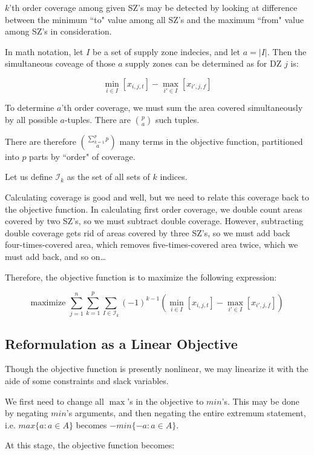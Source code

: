 \documentclass[a4paper]{article}
\begin{document}
$k$'th order coverage among given SZ's may be detected by looking at difference between the minimum ``to" value among all SZ's and the maximum ``from" value among SZ's in consideration.

In math notation, let $I$ be a set of supply zone indecies, and let $a = |I|$. Then the simultaneous coveage of those $a$ supply zones can be determined as for DZ $j$ is:

$$\min_{i \in I} [x_{i,j,t}] - \max_{i' \in I} [x_{i',j,f}]$$

To determine $a$'th order coverage, we must sum the area covered simultaneously by all possible $a$-tuples. There are $p\choose a$ such tuples.

There are therefore $\sum_{k=1}^p p\choose a$ many terms in the objective function, partitioned into $p$ parts by ``order" of coverage.

Let us define $\mathcal{I}_k$ as the set of all sets of $k$ indices.

\vspace{1em}

Calculating coverage is good and well, but we need to relate this coverage back to the objective function. In calculating first order coverage, we double count areas covered by two SZ's, so we must subtract double coverage. However, subtracting double coverage gets rid of areas covered by three SZ's, so we must add back four-times-covered area, which removes five-times-covered area twice, which we must add back, and so on\ldots

Therefore, the objective function is to maximize the following expression:

$$\textrm{maximize } \sum_{j=1}^n\sum_{k=1}^{p} \sum_{I \in \mathcal{I}_k} 
(-1)^{k-1}(\min_{i \in I} [x_{i,j,t}] - \max_{i' \in I} [x_{i',j,f}])$$

\subsection{Reformulation as a Linear Objective}

Though the objective function is presently nonlinear, we may linearize it with the aide of some constraints and slack variables.

We first need to change all $\max$'s in the objective to $min$'s. This may be done by negating $min$'s arguments, and then negating the entire extremum statement, i.e. $max\{a : a \in A\}$ becomes $-min\{-a : a \in A\}$.

At this stage, the objective function becomes:
\end{document}
